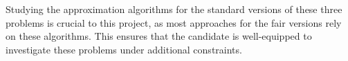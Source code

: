 \documentclass[12pt]{article}
\begin{document}
Studying the approximation algorithms for the standard versions of these three problems is crucial to this project, as most approaches for the fair versions rely on these algorithms. This ensures that the candidate is well-equipped to investigate these problems under additional constraints.
\newpage



\end{document}

